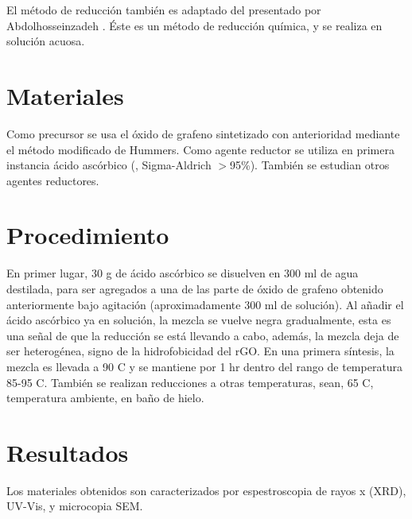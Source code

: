 El método de reducción también es adaptado del presentado por Abdolhosseinzadeh \citep{Abdolhosseinzadeh2015}. Éste es un método de reducción química, y se realiza en solución acuosa.

\section{Materiales}
Como precursor se usa el óxido de grafeno sintetizado con anterioridad mediante el método modificado de Hummers. Como agente reductor se utiliza en primera instancia ácido ascórbico (, Sigma-Aldrich $>$95\%). También se estudian otros agentes reductores. 

\section{Procedimiento}
En primer lugar, 30 g de ácido ascórbico se disuelven en 300 ml de agua destilada, para ser agregados a una de las parte de óxido de grafeno obtenido anteriormente bajo agitación (aproximadamente 300 ml de solución). Al añadir el ácido ascórbico ya en solución, la mezcla se vuelve negra gradualmente, esta es una señal de que la reducción se está llevando a cabo, además, la mezcla deja de ser heterogénea, signo de la hidrofobicidad del rGO. En una primera síntesis, la mezcla es llevada a 90 \degree C y se mantiene por 1 hr dentro del rango de temperatura 85-95 \degree C. También se realizan reducciones a otras temperaturas, sean, 65 \degree C, temperatura ambiente, en baño de hielo.

\section{Resultados}
Los materiales obtenidos son caracterizados por espestroscopia de rayos x (XRD), UV-Vis, y microcopia SEM.


